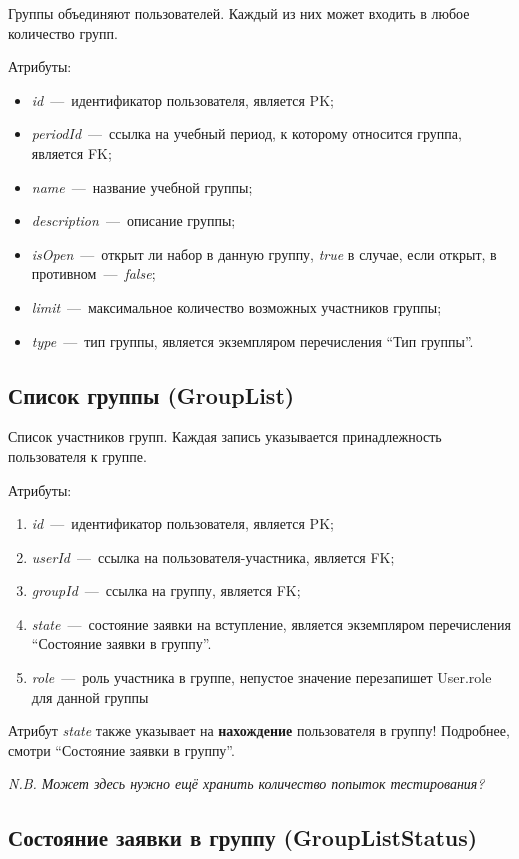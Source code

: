 \documentclass[14pt]{article}
\begin{document}
Группы объединяют пользователей. Каждый из них может входить в любое количество групп.

Атрибуты:
\begin{itemize}
	\item \emph{id}~---~идентификатор пользователя, является PK;
	\item \emph{periodId}~---~ссылка на учебный период, к которому относится группа, является FK;
	\item \emph{name}~---~название учебной группы;
	\item \emph{description}~---~описание группы;
	\item \emph{isOpen}~---~открыт ли набор в данную группу, \emph{true} в случае, если открыт, в противном~---~\emph{false};
	\item \emph{limit}~---~максимальное количество возможных участников группы;	
	\item \emph{type}~---~тип группы, является экземпляром перечисления ``Тип группы''.
\end{itemize}

\subsection{Список группы (GroupList)}

Список участников групп. Каждая запись указывается принадлежность пользователя к группе. 

Атрибуты:
\begin{enumerate}
	\item \emph{id}~---~идентификатор пользователя, является PK; 
	\item \emph{userId}~---~ссылка на пользователя-участника, является FK;
	\item \emph{groupId}~---~ссылка на группу, является FK;
	\item \emph{state}~---~состояние заявки на вступление, является экземпляром перечисления ``Состояние заявки в группу''.
    \item \emph{role}~---~роль участника в группе, непустое значение перезапишет User.role для данной группы
\end{enumerate}

Атрибут \emph{state} также указывает на \textbf{нахождение} пользователя в группу! Подробнее, смотри  ``Состояние заявки в группу''.

\textit{N.B. Может здесь нужно ещё хранить количество попыток тестирования?}

\subsection{Состояние заявки в группу (GroupListStatus)}
\end{document}
